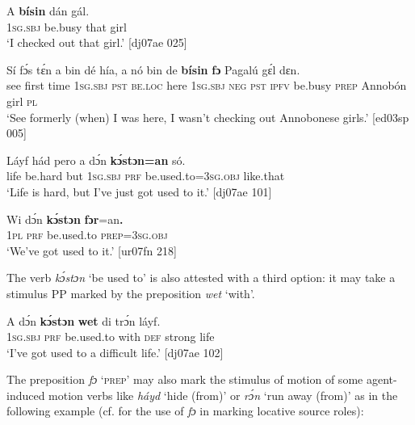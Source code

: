 \ea%
    \label{ex:key:1052}
    \gll A    \textbf{bísin}  dán    gál.\\
\textsc{1sg.sbj}  be.busy  that    girl\\

\glt ‘I checked out that girl.’ [dj07ae 025]
\z


\ea%
    \label{ex:key:1053}
    \gll Sí  fɔ́s  tɛ́n    a    bin  dé    hía,    a    nó
bin  de  \textbf{bísin}  \textbf{fɔ}  Pagalú    gɛ́l  dɛn.\\
see  first  time    \textsc{1sg.sbj}  \textsc{pst}  \textsc{be.loc}  here    \textsc{1sg.sbj}  \textsc{neg}
\textsc{pst}  \textsc{ipfv}  be.busy  \textsc{prep}  Annobón    girl  \textsc{pl}\\

\glt ‘See formerly (when) I was here, I wasn’t checking out 
Annobonese girls.’ [ed03sp 005]
\z


\ea%
    \label{ex:key:1054}
    \gll Láyf    hád    pero  a    dɔ́n  \textbf{kɔ́stɔn=an}    só.\\
life    be.hard  but    \textsc{1sg.sbj}  \textsc{prf}  be.used.to=\textsc{3sg.obj}  like.that\\

\glt ‘Life is hard, but I’ve just got used to it.’ [dj07ae 101]
\z


\ea%
    \label{ex:key:1055}
    \gll Wi  dɔ́n \textbf{  kɔ́stɔn}    \textbf{fɔr}=an\textbf{.}\\
\textsc{1pl}  \textsc{prf}  be.used.to  \textsc{prep}=\textsc{3sg.obj}\\

\glt ‘We’ve got used to it.’ [ur07fn 218]
\z

The verb \textit{kɔ́stɔn} ‘be used to’ is also attested with a third option: it may take a stimulus PP marked by the preposition \textit{wet} ‘with’.


\ea%
    \label{ex:key:1056}
    \gll A    dɔ́n  \textbf{kɔ́stɔn}    \textbf{wet}    di  trɔ́n    láyf.\\
\textsc{1sg.sbj}  \textsc{prf}  be.used.to  with    \textsc{def}  strong  life\\

\glt ‘I’ve got used to a difficult life.’ [dj07ae 102]
\z

The preposition \textit{fɔ} ‘\textsc{prep}’ may also mark the stimulus of motion of some agent-induced motion verbs like \textit{háyd} ‘hide (from)’ or \textit{rɔ́n} ‘run away (from)’ as in the following example (cf.  for the use of \textit{fɔ} in marking locative source roles): 


